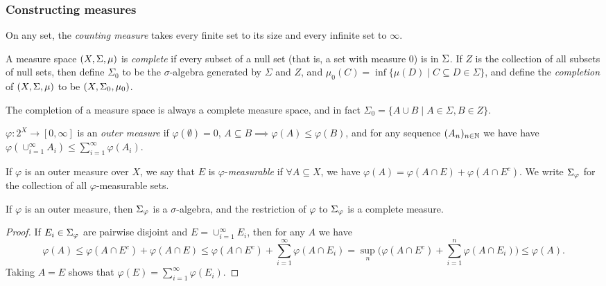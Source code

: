 \documentclass[letterpaper,11pt]{report}
\begin{document}
\subsubsection{Constructing measures}

\begin{defn} On any set, the \emph{counting measure} takes every finite set to its size and every infinite set to $\infty$.
\end{defn}

\begin{defn} A measure space $(X, \Sigma, \mu)$ is \emph{complete} if every subset of a null set (that is, a set with measure $0$) is in $\Sigma$. If $Z$ is the collection of all subsets of null sets, then define $\Sigma_0$ to be the $\sigma$-algebra generated by $\Sigma$ and $Z$, and $\mu_0(C) = \inf\{\mu(D) \mid C \subseteq D \in \Sigma\}$, and define the \emph{completion} of $(X,\Sigma,\mu)$ to be $(X,\Sigma_0,\mu_0)$.
\end{defn}

\begin{prop} The completion of a measure space is always a complete measure space, and in fact $\Sigma_0 = \{A \cup B \mid A \in \Sigma, B \in Z\}$.
\end{prop}

\begin{defn} $\varphi : 2^X \rightarrow [0,\infty]$ is an \emph{outer measure} if $\varphi(\emptyset) = 0$, $A \subseteq B \implies \varphi(A) \le \varphi(B)$, and for any sequence $(A_n)_{n\in \mathbb{N}}$ we have have $\varphi(\cup_{i=1}^\infty A_i) \le \sum_{i=1}^\infty \varphi(A_i)$.
\end{defn}

\begin{defn} If $\varphi$ is an outer measure over $X$, we say that $E$ is $\varphi$-\emph{measurable} if $\forall A \subseteq X$, we have $\varphi(A) = \varphi(A\cap E) + \varphi(A\cap E^c)$. We write $\Sigma_\varphi$ for the collection of all $\varphi$-measurable sets.
\end{defn}

\begin{thm} If $\varphi$ is an outer measure, then $\Sigma_\varphi$ is a $\sigma$-algebra, and the restriction of $\varphi$ to $\Sigma_\varphi$ is a complete measure.
\end{thm}
\begin{proof} If $E_i \in \Sigma_\varphi$ are pairwise disjoint and $E = \cup_{i=1}^\infty E_i$, then for any $A$ we have
\[
\varphi(A) \le \varphi(A\cap E^c) + \varphi(A\cap E) \le \varphi(A\cap E^c) + \sum_{i=1}^\infty \varphi(A\cap E_i) = \sup_n \Big(\varphi(A\cap E^c) + \sum_{i=1}^n \varphi(A\cap E_i)\Big) \le \varphi(A).
\]
Taking $A = E$ shows that $\varphi(E) = \sum_{i=1}^\infty \varphi(E_i)$.
\end{proof}
\end{document}
